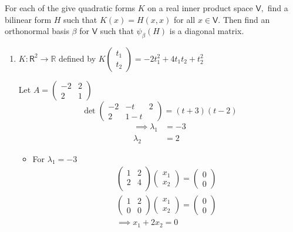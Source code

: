 For each of the give quadratic forms $K$ on a real inner product space
$\mathsf{V},$ find a bilinear form $H$ such that $K(x) = H(x,x)$ for
all $x \in \mathsf{V}.$ Then find an orthonormal basis $\beta$ for
$\mathsf{V}$ such that $\psi_\beta(H)$ is a diagonal matrix.
\begin{enumerate}
\item $K \colon \mathsf{R}^2 \to \mathbb{R}$ defined by
  $K\begin{pmatrix}t_1\\t_2\end{pmatrix} = -2t_1^2 + 4t_1t_2 +t_2^2$

Let $ A = \begin{pmatrix} -2&2\\2 & 1\end{pmatrix}$
\begin{equation}
\det{
\begin{pmatrix}
-2 & -t & 2\\
2  & 1- t
\end{pmatrix}
} = (t+3)(t-2)
\end{equation}
\begin{align}
\implies \lambda_1 &= -3\\
\lambda_2 &= 2
\end{align}
\begin{itemize}
\item For $\lambda_1= -3$
\begin{gather}
\begin{pmatrix}
1 & 2\\
2 & 4\\
\end{pmatrix}
\begin{pmatrix}
x_1\\x_2
\end{pmatrix}
=
\begin{pmatrix}
0\\0
\end{pmatrix}\\
\begin{pmatrix}
1 & 2\\
0 & 0
\end{pmatrix}
\begin{pmatrix}
x_1\\x_2
\end{pmatrix}
=
\begin{pmatrix}
0\\0
\end{pmatrix}\\
\implies x_1 + 2x_2 = 0\\

\end{gather}
\end{itemize}
\end{enumerate}
